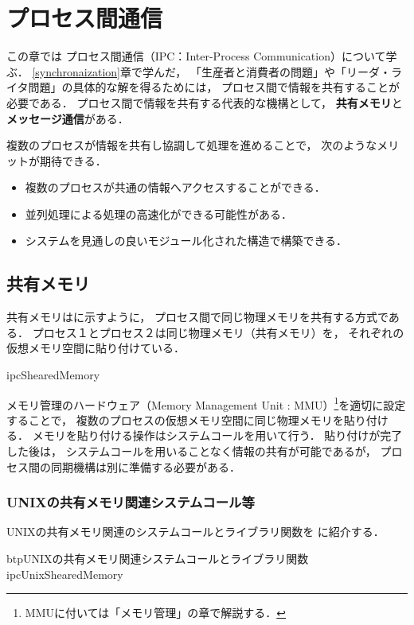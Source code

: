 \chapter{プロセス間通信}
\label{interProcessCommunication}
この章では
プロセス間通信（IPC：Inter-Process Communication）について学ぶ．
\ref{synchronaization}章で学んだ，
「生産者と消費者の問題」や「リーダ・ライタ問題」の具体的な解を得るためには，
プロセス間で情報を共有することが必要である．
プロセス間で情報を共有する代表的な機構として，
{\bf 共有メモリ}と{\bf メッセージ通信}がある．

複数のプロセスが情報を共有し協調して処理を進めることで，
次のようなメリットが期待できる．

\begin{itemize}
\item 複数のプロセスが共通の情報へアクセスすることができる．
\item 並列処理による処理の高速化ができる可能性がある．
\item システムを見通しの良いモジュール化された構造で構築できる．
\end{itemize}

\section{共有メモリ}
共有メモリはに示すように，
プロセス間で同じ物理メモリを共有する方式である．
プロセス１とプロセス２は同じ物理メモリ（共有メモリ）を，
それぞれの仮想メモリ空間に貼り付けている．

{ipcShearedMemory}

メモリ管理のハードウェア（Memory Management Unit : MMU）\footnote{
MMUに付いては「メモリ管理」の章で解説する．}を適切に設定することで，
複数のプロセスの仮想メモリ空間に同じ物理メモリを貼り付ける．
メモリを貼り付ける操作はシステムコールを用いて行う．
貼り付けが完了した後は，
システムコールを用いることなく情報の共有が可能であるが，
プロセス間の同期機構は別に準備する必要がある．

\subsection{UNIXの共有メモリ関連システムコール等}
UNIXの共有メモリ関連のシステムコールとライブラリ関数を
に紹介する．

\begin{myfig}{btp}{UNIXの共有メモリ関連システムコールとライブラリ関数}
{ipcUnixShearedMemory}

\end{myfig}

